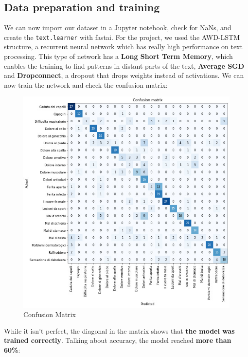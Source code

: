 \documentclass[conference]{IEEEtran}
\begin{document}
\subsection{Data preparation and training}
We can now import our dataset in a Jupyter notebook, check for NaNs, and create the \texttt{text.learner} with fastai. For the project, we used the AWD-LSTM structure, a recurrent neural network which has really high performance on text processing. This type of network has a \textbf{Long Short Term Memory}\cite{b3}, which enables the training to find patterns in distant parts of the text, \textbf{Average SGD} and \textbf{Dropconnect}, a dropout that drops weights instead of activations. We can now train the network and check the confusion matrix:
\begin{figure}[H]
    \begin{center}
        \includegraphics[width=\columnwidth]{ConfusionMatrix.jpg}
    \end{center}
    \caption{Confusion Matrix}
    \label{fig:confusion-matrix}
\end{figure}
While it isn't perfect, the diagonal in the matrix shows that \textbf{the model was trained correctly}. Talking about accuracy, the model reached \textbf{more than 60\%}:
\end{document}
